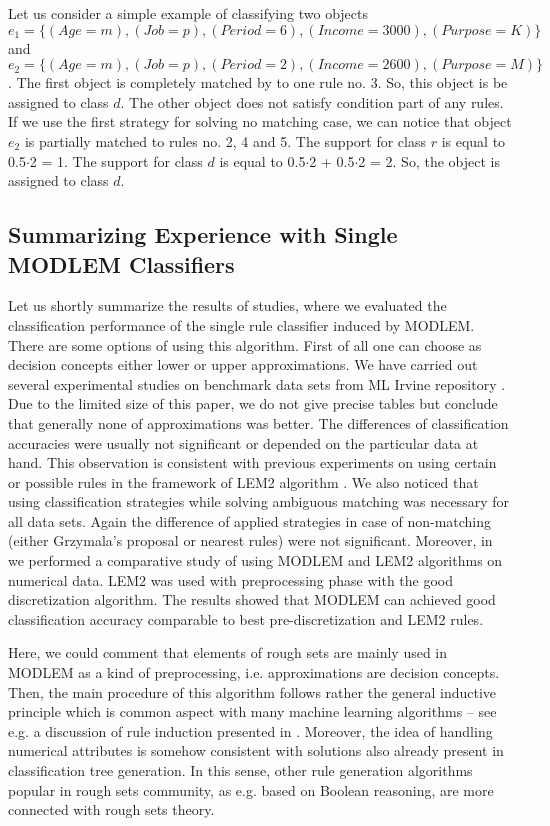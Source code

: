 \documentclass{llncs}
\begin{document}
Let us consider a simple example of classifying two objects $e_1 = \{(Age
=m),(Job =p), (Period =6), (Income = 3000), (Purpose = K)\}$ and $e_2 =
\{(Age =m),(Job =p), (Period =2), (Income = 2600), (Purpose = M)\}$. The
first object is completely matched by to one rule no. 3. So, this object is
be assigned to class $d$. The other object does not satisfy condition part
of any rules. If we use the first strategy for solving no matching case, we
can notice that object $e_2$ is partially matched to rules no. 2, 4 and 5.
The support for class $r$ is equal to 0.5$\cdot$2 = 1. The support for class
$d$ is equal to 0.5$\cdot$2 + 0.5$\cdot$2 = 2. So, the object is assigned to
class $d$.


\subsection{Summarizing Experience with Single MODLEM Classifiers}


Let us shortly summarize the results of studies, where we evaluated the
classification performance of the single rule classifier induced by MODLEM.
There are some options of using this algorithm. First of all one can choose
as decision concepts either lower or upper approximations. We have carried
out several experimental studies on benchmark data sets from ML Irvine
repository \cite{irvine}. Due to the limited size of this paper, we do not
give precise tables but conclude that generally none of approximations was
better. The differences of classification accuracies were usually not
significant or depended on the particular data at hand. This observation is
consistent with previous experiments on using certain or possible rules in
the framework of LEM2 algorithm \cite{grzym98}. We also noticed that using
classification strategies while solving ambiguous matching was necessary for
all data sets. Again the difference of applied strategies in case of
non-matching (either Grzymala's proposal or nearest rules) were not
significant. Moreover, in \cite{GrzymStef} we performed a comparative study
of using MODLEM and LEM2 algorithms on numerical data. LEM2 was used with
preprocessing phase with the good discretization algorithm. The results
showed that MODLEM can achieved good classification accuracy comparable to
best pre-discretization and LEM2 rules.

Here, we could comment that elements of rough sets are mainly used in MODLEM
as a kind of preprocessing, i.e. approximations are  decision concepts.
Then, the main procedure of this algorithm follows rather the general
inductive principle which is common aspect with many machine learning
algorithms -- see e.g. a discussion of rule induction presented in
\cite{Mitchell}. Moreover, the idea of handling numerical attributes is
somehow consistent with solutions also already present in classification
tree generation. In this sense, other rule generation algorithms popular in
rough sets community, as e.g. based on Boolean reasoning, are more connected
with rough sets theory.
\end{document}
